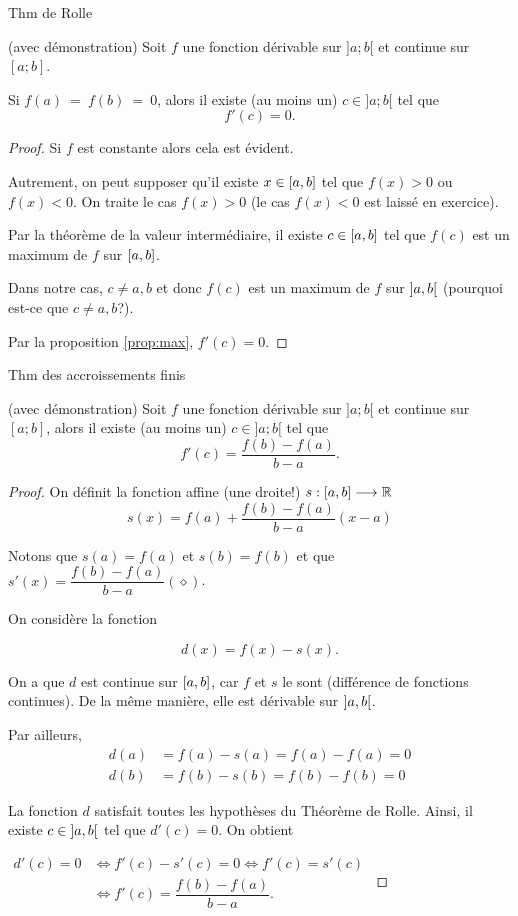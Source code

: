 \documentclass[a4paper,12pt]{article}
\begin{document}
\begin{thm}
	Thm de Rolle

	(avec démonstration)
	\tcblower
	Soit $f$ une fonction dérivable sur $] a;b[$ et continue sur $[a;b]$. 

	Si $f(a)~=~f(b)~=~0$, alors il existe (au moins un) $c\in] a;b[$ tel que 
	\[f'(c)=0.\]
	\begin{proof}
		Si $f$ est constante alors cela est évident.

		Autrement, on peut supposer qu'il existe $x\in \interval{a}{b}$ tel que $f(x)>0$ ou $f(x)<0$. On traite le cas $f(x)>0$ (le cas $f(x)<0$ est laissé en exercice).  

Par la théorème de la valeur intermédiaire, il existe $c\in \interval{a}{b}$ tel que $f(c)$ est un maximum de $f$ sur $\interval{a}{b}$. 

Dans notre cas, $c\neq a,b$ et donc $f(c)$ est un maximum de $f$ sur $\ointerval{a}{b}$ (pourquoi est-ce que $c\neq a,b$?).

Par la proposition \ref{prop:max}, $f'(c)=0$.  
	\end{proof}
\end{thm}
\begin{thm}
	Thm des accroissements finis

	(avec démonstration)
	\tcblower
	Soit $f$ une fonction dérivable sur $] a;b[$ et continue sur $[a;b]$, alors il existe (au moins un) $c\in ]a;b[$ tel que 
	\[f'(c)=\dfrac{f(b)-f(a)}{b-a}.\]
	
	\begin{proof}
		On définit la fonction affine (une droite!) $s:\interval{a}{b}\longrightarrow \mathbb{R}$ 
		\[s(x)=f(a)+\dfrac{f(b)-f(a)}{b-a}(x-a)\]

		Notons que $s(a)=f(a)$ et $s(b)=f(b)$ et que $s'(x)=\dfrac{f(b)-f(a)}{b-a} (\diamond)$.

	On considère la fonction 

	\[d(x)=f(x)-s(x).\]

	On a que $d$ est continue sur $\interval{a}{b}$, car $f$ et $s$ le sont (différence de fonctions continues). De la même manière, elle est dérivable sur $\ointerval{a}{b}$.  

	Par ailleurs, 
	\begin{align*}
		d(a)&=f(a)-s(a)=f(a)-f(a)=0\\
		d(b)&=f(b)-s(b)=f(b)-f(b)=0
	\end{align*}

	La fonction $d$ satisfait toutes les hypothèses du Théorème de Rolle. Ainsi, il existe $c\in \ointerval{a}{b}$ tel que $d'(c)=0$. On obtient
	
	$\begin{aligned}d'(c)=0 &\iff f'(c)-s'(c)=0\iff f'(c)=s'(c)\\
	&\iff f'(c)=\dfrac{f(b)-f(a)}{b-a}.
	\end{aligned}$

	\end{proof}
\end{thm}
\end{document}
